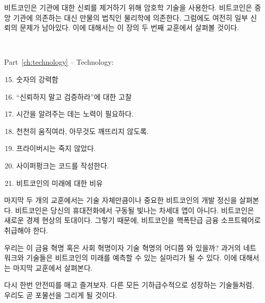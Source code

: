 \begin{comment}
	Cryptography is what Bitcoin uses to remove trust in authorities.
	Instead of relying on centralized institutions, the system relies on the final
	authority of our universe: physics. Some grains of trust still remain, however.
	We will examine these grains in the second lesson of this chapter.
\end{comment}
비트코인은 기관에 대한 신뢰를 제거하기 위해 암호학 기술을 사용한다.
비트코인은 중앙 기관에 의존하는 대신 만물의 법칙인 물리학에 의존한다.
그럼에도 여전히 일부 신뢰의 문제가 남아있다.
이에 대해서는 이 장의 두 번째 교훈에서 살펴볼 것이다.

~

\begin{samepage}
	Part~\ref{ch:technology} -- Technology:
	
	\begin{enumerate}
		\setcounter{enumi}{14}
		\item 숫자의 강력함
		\item \enquote{신뢰하지 말고 검증하라}에 대한 고찰
		\item 시간을 알려주는 데는 노력이 필요하다.
		\item 천천히 움직여라, 아무것도 깨뜨리지 않도록.
		\item 프라이버시는 죽지 않았다.
		\item 사이퍼펑크는 코드를 작성한다.
		\item 비트코인의 미래에 대한 비유
	\end{enumerate}
\end{samepage}

\begin{comment}
	The last couple of lessons explore the ethos of technological development in
	Bitcoin, which is arguably as important as the technology itself. Bitcoin is not
	the next shiny app on your phone. It is the foundation of a new economic
	reality, which is why Bitcoin should be treated as nuclear-grade financial
	software.
\end{comment}
마지막 두 개의 교훈에서는 기술 자체만큼이나 중요한 비트코인의 개발 정신을 살펴본다.
비트코인은 당신의 휴대전화에서 구동될 빛나는 차세대 앱이 아니다.
비트코인은 새로운 경제 현상의 토대이다. 
그렇기 때문에, 비트코인을 핵폭탄급 금융 소프트웨어로 취급해야 한다.

\begin{comment}
	Where are we in this financial, societal, and technological revolution? 
	
	Networks and technologies of the past may serve as metaphors for Bitcoin's future, which
	are explored in the last lesson of this chapter.
\end{comment}
우리는 이 금융 혁명 혹은 사회 혁명이자 기술 혁명의 어디쯤 와 있을까?
과거의 네트워크와 기술들은 비트코인의 미래를 예측할 수 있는 실마리가 될 수 있다. 이에 대해서는 마지막 교훈에서 살펴본다. 

\begin{comment}
	Once more, strap in and enjoy the ride. Like all exponential technologies, we
	are about to go parabolic.
\end{comment}
다시 한번 안전띠를 매고 즐겨보자. 다른 모든 기하급수적으로 성장하는 기술들처럼, 우리도 곧 포물선을 그리게 될 것이다.

